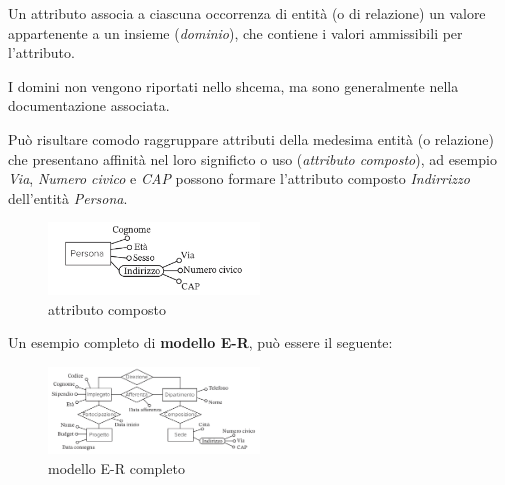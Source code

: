 \documentclass[a4paper, 12pt]{book}
\begin{document}
    Un attributo associa a ciascuna occorrenza di entità (o di relazione) un valore appartenente a un insieme (\textit{dominio}), che contiene i valori ammissibili per l'attributo.

    I domini non vengono riportati nello shcema, ma sono generalmente nella documentazione associata.

    Può risultare comodo raggruppare attributi della medesima entità (o relazione) che presentano affinità nel loro significto o uso (\textit{attributo composto}), ad esempio \textit{Via}, \textit{Numero civico} e \textit{CAP} possono formare l'attributo composto \textit{Indirrizzo} dell'entità \textit{Persona}.

    \begin{figure}[H]
      \centering
      \includegraphics[width=0.5\textwidth, keepaspectratio]{images/attributoComposto.jpeg}
      \caption{attributo composto}
    \end{figure}

    Un esempio completo di \textbf{modello E-R}, può essere il seguente:
    \begin{figure}[H]
      \centering
      \includegraphics[width=0.5\textwidth, keepaspectratio]{images/modelloE-R.jpeg}
      \caption{modello E-R completo}
    \end{figure}
\end{document}
